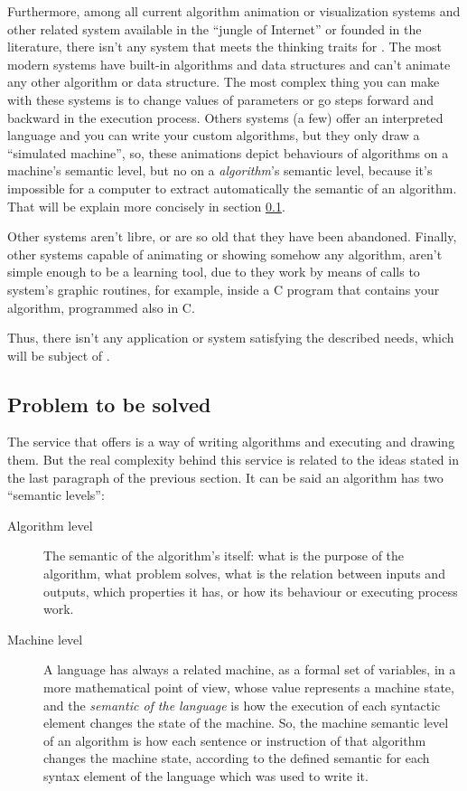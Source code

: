 \documentclass{article}
\begin{document}
Furthermore, among all current algorithm animation or visualization systems and
other related system available in the ``jungle of Internet'' or founded in the
literature, there isn't any system that meets the thinking traits for \fav. The
most modern systems have built-in algorithms and data structures and can't
animate any other algorithm or data structure. The most complex thing you can
make with these systems is to change values of parameters or go steps forward
and backward in the execution process. Others systems (a few) offer an
interpreted language and you can write your custom algorithms, but they only
draw a ``simulated machine'', so, these animations depict behaviours of
algorithms on a machine's semantic level, but no on a \textit{algorithm}'s
semantic level, because it's impossible for a computer to extract automatically
the semantic of an algorithm. That will be explain more concisely in section
\ref{ssec:problem}.

Other systems aren't libre, or are so old that they have been
abandoned. Finally, other systems capable of animating or showing somehow any
algorithm, aren't simple enough to be a learning tool, due to they work by means
of calls to system's graphic routines, for example, inside a C program that
contains your algorithm, programmed also in C.

Thus, there isn't any application or system satisfying the described needs,
which will be subject of \fav.

\subsection{Problem to be solved}
\label{ssec:problem}
The service that \fav offers is a way of writing algorithms and executing and
drawing them. But the real complexity behind this service is related to the
ideas stated in the last paragraph of the previous section. It can be said an
algorithm has two ``semantic levels'':

\begin{description}
  \item[Algorithm level] The semantic of the algorithm's itself: what is the
    purpose of the algorithm, what problem solves, what is the relation between
    inputs and outputs, which properties it has, or how its behaviour or
    executing process work.
  \item[Machine level] A language has always a related machine, as a formal set
    of variables, in a more mathematical point of view, whose value represents a
    machine state, and the \textit{semantic of the language} is how the
    execution of each syntactic element changes the state of the machine. So,
    the machine semantic level of an algorithm is how each sentence or
    instruction of that algorithm changes the machine state, according to the
    defined semantic for each syntax element of the language which was used to
    write it.
\end{description}
\end{document}
